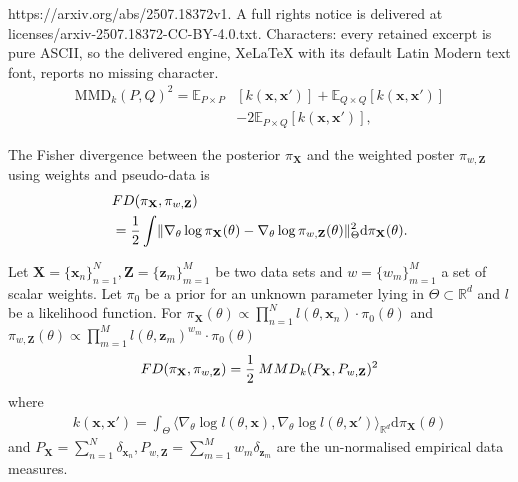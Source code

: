 \documentclass[10pt,a4paper]{amsart}
\newcommand{\bX}{\mathbf{X}}
\newcommand{\bZ}{\mathbf{Z}}
\newcommand{\bbE}{\mathbb{E}}
\newcommand{\bbR}{\mathbb{R}}
\newcommand{\bx}{\mathbf{x}}
\newcommand{\bz}{\mathbf{z}}
\begin{document}
https://arxiv.org/abs/2507.18372v1. A full rights notice is delivered at licenses/arxiv-2507.18372-CC-BY-4.0.txt. Characters: every retained excerpt is pure ASCII, so the delivered engine, XeLaTeX with its default Latin Modern text font, reports no missing character.
\begin{align}
	\text{MMD}_{k}(P,Q)^{2} = \bbE_{P\times P}&[k(\bx,\bx')] + \bbE_{Q\times Q}[k(\bx,\bx')]\nonumber\\
	& - 2\bbE_{P\times Q}[k(\bx,\bx')] \label{eq:MMD_expansion},
\end{align}

\begin{definition}
	The Fisher divergence between the posterior $\pi_{\bX}$ and the weighted poster $\pi_{w,\bZ}$ using weights and pseudo-data is 
	\begin{align}
		&\emph{FD}(\pi_{\bX},\pi_{w,\bZ}) \nonumber\\
		& = \frac{1}{2}\int \lVert \nabla_{\theta}\log\pi_{\bX}(\theta) - \nabla_{\theta}\log\pi_{w,\bZ}(\theta)\rVert_{\Theta}^{2}\mathrm{d}\pi_{\bX}(\theta).\label{eq:FD}
	\end{align}
\end{definition}

\begin{theorem}\label{thm:characterise}
	Let $\bX = \{\bx_{n}\}_{n=1}^{N}, \bZ = \{\bz_{m}\}_{m=1}^{M}$ be two data sets and $w = \{w_{m}\}_{m=1}^{M}$ a set of scalar weights. Let $\pi_{0}$ be a prior for an unknown parameter lying in $\Theta \subset \bbR^{d}$ and $l$ be a likelihood function. For  ${\pi_{\bX}(\theta)\propto\prod_{n=1}^{N}l(\theta,\bx_{n})\cdot\pi_{0}(\theta)}$ and ${\pi_{w,\bZ}(\theta)\propto\prod_{m=1}^{M}l(\theta,\bz_{m})^{w_{m}}\cdot\pi_{0}(\theta)}$  
	\begin{align*}
		\emph{FD}(\pi_{\bX},\pi_{w,\bZ}) = \frac{1}{2}\:\emph{MMD}_{k}(P_{\bX}, P_{w,\bZ})^{2} 
	\end{align*}
	where 
	\begin{align*}
		k(\bx,\bx') = \int_{\Theta}\langle\nabla_{\theta}\log l(\theta,\bx),\nabla_{\theta}\log l(\theta,\bx')\rangle_{\bbR^{d}} \mathrm{d}\pi_{\bX}(\theta)
	\end{align*}
	and $P_{\bX} = \sum_{n=1}^{N}\delta_{\bx_{n}}, P_{w,\bZ} = \sum_{m=1}^{M}w_{m}\delta_{\bz_{m}}$ are the un-normalised empirical data measures. 
\end{theorem}
\end{document}
